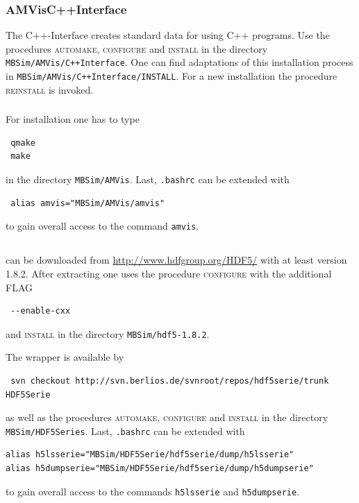 \subsubsection{AMVisC++Interface}
The C++-Interface creates standard data for \AMVis{} using C++ programs. Use the procedures \textsc{automake, configure} and \textsc{install} in the directory \texttt{MBSim/AMVis/C++Interface}. One can find adaptations of this installation process in \texttt{MBSim/AMVis/C++Interface/INSTALL}.  For a new installation the procedure \textsc{reinstall} is invoked.

\subsubsection{\AMVis{}}
For installation one has to type 
\begin{verbatim}
 qmake
 make
\end{verbatim}
in the directory \texttt{MBSim/AMVis}. Last, \texttt{.bashrc} can be extended with
\begin{verbatim}
 alias amvis="MBSim/AMVis/amvis"
\end{verbatim}
to gain overall access to the command \texttt{amvis}.

\subsection{\HDF}
\HDF can be downloaded from \url{http://www.hdfgroup.org/HDF5/} with at least version 1.8.2. After extracting one uses the procedure \textsc{configure} with the additional FLAG
\begin{verbatim}
 --enable-cxx
\end{verbatim}
and \textsc{install} in the directory \texttt{MBSim/hdf5-1.8.2}.

The \HDF wrapper is available by
\begin{verbatim}
 svn checkout http://svn.berlios.de/svnroot/repos/hdf5serie/trunk HDF5Serie
\end{verbatim}
as well as the procedures \textsc{automake, configure} and \textsc{install} in the directory \texttt{MBSim/HDF5Series}. Last, \texttt{.bashrc} can be extended with
\begin{verbatim}
alias h5lsserie="MBSim/HDF5Serie/hdf5serie/dump/h5lsserie"
alias h5dumpserie="MBSim/HDF5Serie/hdf5serie/dump/h5dumpserie"
\end{verbatim}
to gain overall access to the commands \texttt{h5lsserie} and \texttt{h5dumpserie}.


